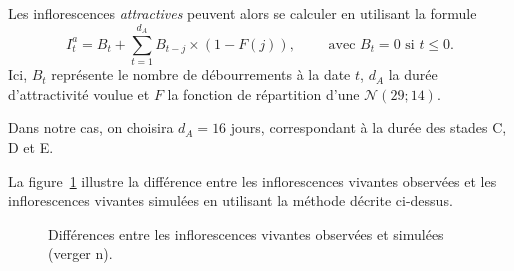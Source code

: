 Les inflorescences \emph{attractives} peuvent alors se calculer en utilisant la formule
\[
I_{t}^{a} = B_t + \sum_{t = 1}^{d_A} B_{t-j} \times \left( 1 - F(j) \right), \qquad \text{ avec } B_{t} = 0 \text{ si } t \leq 0. 
\]
Ici, $B_t$ représente le nombre de débourrements à la date $t$, $d_A$ la durée d'attractivité voulue et $F$ la fonction de répartition d'une $\mathcal{N}\left( 29; 14 \right)$.

Dans notre cas, on choisira $d_A = 16$ jours, correspondant à la durée des stades C, D et E.

La figure~\ref{fig:compsimuobs} illustre la différence entre les inflorescences vivantes observées et les inflorescences vivantes simulées en utilisant la méthode décrite ci-dessus.

\begin{figure}[h]
\centering
 \caption{Différences entre les inflorescences vivantes observées et simulées (verger n).}
 \label{fig:compsimuobs}
\end{figure}
